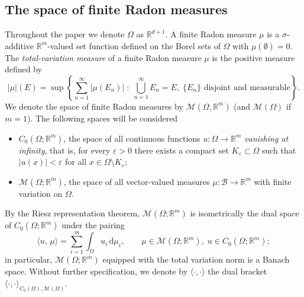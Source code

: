 \documentclass[11pt]{amsart}
\theoremstyle{definition}
\theoremstyle{remark}
\begin{document}
\subsection{The space of finite Radon measures}
Throughout the paper we denote $\Omega$ as $\mathbb{R}^{d + 1}$. 
A finite Radon measure $\mu$ is a $\sigma$-additive $\mathbb{R}^m$-valued set function defined on the Borel sets of $\Omega$ with $\mu(\emptyset) = 0$.                                                                              
The \emph{total-variation measure} of a finite Radon measure $\mu$ is the positive measure defined by                                                                                                                                       
\begin{equation*}                                                                                                                                                                                                                                          
|\mu|(E) = \sup \left\{ \sum_{n=1}^{\infty} |\mu(E_n)| \;:\; \bigcup_{n=1}^{\infty} E_n = E,\; \{E_n\} \text{ disjoint and measurable} \right\}.
\end{equation*}
We denote the space of finite Radon measures by $\mathcal{M}(\Omega, \mathbb{R}^m)$ (and $\mathcal{M}(\Omega)$ if $m = 1$). 
The following spaces will be considered
\begin{itemize}
  \item $C_0(\Omega; \mathbb{R}^m)$, the space of all continuous functions $u : \Omega \to \mathbb{R}^m$ \emph{vanishing at infinity}, that is, for every $\varepsilon > 0$ there exists a compact set $K_\varepsilon \subset \Omega$ such that $|u(x)| < \varepsilon$ for all $x \in \Omega \setminus K_\varepsilon$;
  \item $\mathcal{M}(\Omega; \mathbb{R}^m)$, the space of all vector-valued measures $\mu : \mathcal{B} \to \mathbb{R}^m$ with finite variation on $\Omega$.
\end{itemize}

By the Riesz representation theorem, $\mathcal{M}(\Omega; \mathbb{R}^m)$ is isometrically the dual space of $C_0(\Omega; \mathbb{R}^m)$ under the pairing
\begin{equation*}
\langle u,\, \mu \rangle = \sum_{i=1}^{m} \int_\Omega u_i \, \mathrm{d}\mu_i,
\qquad \mu \in \mathcal{M}(\Omega; \mathbb{R}^m), \; u \in C_0(\Omega; \mathbb{R}^m);
\end{equation*}
in particular, $\mathcal{M}(\Omega; \mathbb{R}^m)$ equipped with the total variation norm is a Banach space.
Without further specification, we denote by $\langle \cdot, \cdot\rangle$ the dual bracket $\langle \cdot, \cdot \rangle_{C_0(\Omega),\mathcal{M}(\Omega)}$.
\end{document}
